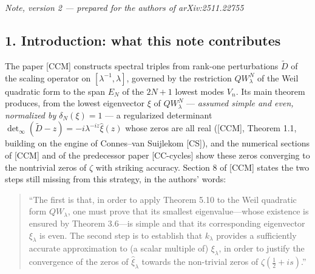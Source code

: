 \documentclass[
  letterpaper,
  11pt]{article}
\theoremstyle{plain}
\theoremstyle{definition}
\theoremstyle{remark}
\begin{document}
\emph{Note, version 2 --- prepared for the authors of arXiv:2511.22755}

\subsection{1. Introduction: what this note contributes}\label{introduction-what-this-note-contributes}

The paper {[}CCM{]} constructs spectral triples from rank-one perturbations \(\widetilde D\) of the scaling operator on \([\lambda^{-1},\lambda]\), governed by the restriction \(QW_\lambda^N\) of the Weil quadratic form to the span \(E_N\) of the \(2N+1\) lowest modes \(V_n\). Its main theorem produces, from the lowest eigenvector \(\xi\) of \(QW_\lambda^N\) --- \emph{assumed simple and even, normalized by \(\delta_N(\xi)=1\)} --- a regularized determinant \(\det\nolimits_\infty(\widetilde D - z) = -i\lambda^{-iz}\widehat\xi(z)\) whose zeros are all real ({[}CCM{]}, Theorem 1.1, building on the engine of Connes--van Suijlekom {[}CS{]}), and the numerical sections of {[}CCM{]} and of the predecessor paper {[}CC-cycles{]} show these zeros converging to the nontrivial zeros of \(\zeta\) with striking accuracy. Section 8 of {[}CCM{]} states the two steps still missing from this strategy, in the authors' words:

\begin{quote}
``The first is that, in order to apply Theorem 5.10 to the Weil quadratic form \(QW_\lambda\), one must prove that its smallest eigenvalue---whose existence is ensured by Theorem 3.6---is simple and that its corresponding eigenvector \(\xi_\lambda\) is even. The second step is to establish that \(k_\lambda\) provides a sufficiently accurate approximation to (a scalar multiple of) \(\xi_\lambda\), in order to justify the convergence of the zeros of \(\widehat\xi_\lambda\) towards the non-trivial zeros of \(\zeta(\frac12+is)\).''
\end{quote}
\end{document}

